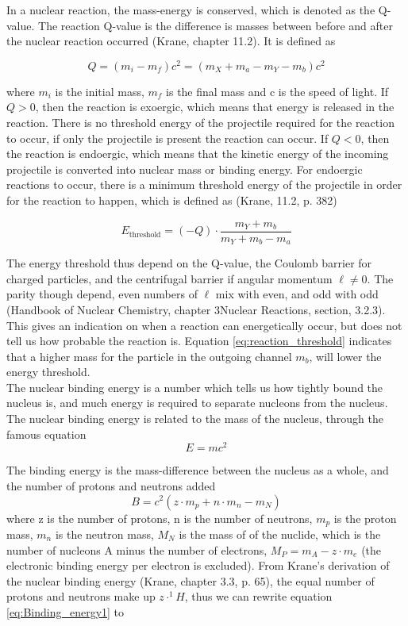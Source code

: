 \documentclass[a4paper,11pt,twoside]{book}
\begin{document}
\noindent In a nuclear reaction, the mass-energy is conserved, which is denoted as the Q-value. The reaction Q-value is the difference is masses between before and after the nuclear reaction occurred (Krane, chapter 11.2). It is defined as 

\begin{equation}
    Q = (m_i - m_f)c^2 = (m_X + m_a - m_Y - m_b)c^2
\end{equation}

\noindent where $m_i$ is the initial mass, $m_f$ is the final mass and c is the speed of light. If $Q>0$, then the reaction is exoergic, which means that energy is released in the reaction. There is no threshold energy of the projectile required for the reaction to occur, if only the projectile is present the reaction can occur. If $Q<0$, then the reaction is endoergic, which means that the kinetic energy of the incoming projectile is converted into nuclear mass or binding energy. For endoergic reactions to occur, there is a minimum threshold energy of the projectile in order for the reaction to happen, which is defined as (Krane, 11.2, p. 382)

\begin{equation} \label{eq:reaction_threshold}
    E_\text{threshold} = (-Q) \cdot \frac{m_Y +m_b}{m_Y + m_b -m_a}
\end{equation}


\noindent The energy threshold thus depend on the Q-value, the Coulomb barrier for charged particles, and the centrifugal barrier if angular momentum $\ell\neq 0$. The parity though depend, even numbers of $\ell$ mix with even, and odd with odd (Handbook of Nuclear Chemistry, chapter 3Nuclear Reactions, section, 3.2.3). This gives an indication on when a reaction can energetically occur, but does not tell us how probable the reaction is. Equation \ref{eq:reaction_threshold} indicates that a higher mass for the particle in the outgoing channel $m_b$, will lower the energy threshold.\\ 

The nuclear binding energy is a number which tells us how tightly bound the nucleus is, and much energy is required to separate nucleons from the nucleus. The nuclear binding energy is related to the mass of the nucleus, through the famous equation 
\begin{equation}
    E = mc^2
\end{equation}

\noindent 
The binding energy is the mass-difference between the nucleus as a whole, and the number of protons and neutrons added
\begin{equation} \label{eq:Binding_energy1}
    B = c^2(z\cdot m_p + n \cdot m_n - m_N)
\end{equation}
\noindent where z is the number of protons, n is the number of neutrons, $m_p$ is the proton mass, $m_n$ is the neutron mass, $M_N$ is the mass of of the nuclide, which is the number of nucleons A minus the number of electrons, $M_P = m_A - z\cdot m_e$ (the electronic binding energy per electron is excluded). From Krane's derivation of the nuclear binding energy (Krane, chapter 3.3, p. 65), the equal number of protons and neutrons make up $z\cdot^1H$, thus we can rewrite equation \ref{eq:Binding_energy1} to 
\end{document}
